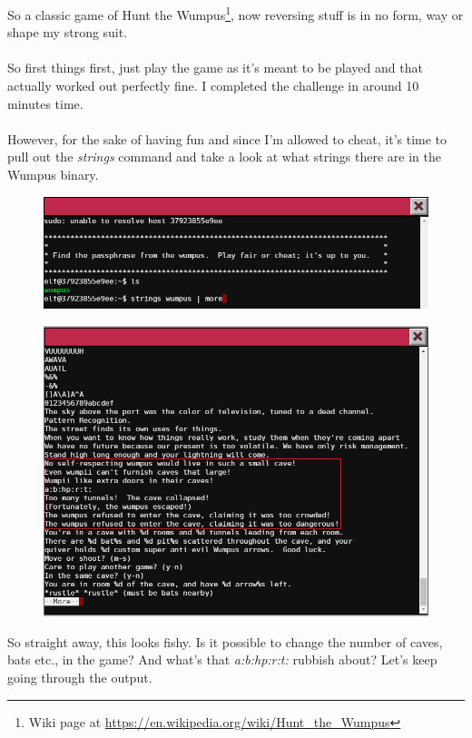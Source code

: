 \documentclass[writeup.tex]{subfiles}
\begin{document}
			So a classic game of Hunt the Wumpus\footnote{Wiki page at \url{https://en.wikipedia.org/wiki/Hunt_the_Wumpus}}, now reversing stuff is in no form, way or shape my strong suit.\\
			\\
			So first things first, just play the game as it's meant to be played and that actually worked out perfectly fine. I completed the challenge in around 10 minutes time.\\
			\\
			However, for the sake of having fun and since I'm allowed to cheat, it's time to pull out the \textit{strings} command and take a look at what strings there are in the Wumpus binary.
			
			\begin{figure}[H]
				\centering
				\includegraphics[width=\linewidth]{"screenshots/terminals/Terminal 4 - ls"}
			\end{figure}
			\begin{figure}[H]
				\centering
				\includegraphics[width=\linewidth]{"screenshots/terminals/Terminal 4 - strings"}
			\end{figure}

			So straight away, this looks fishy. Is it possible to change the number of caves, bats etc., in the game? And what's that \textit{a:b:hp:r:t:} rubbish about? Let's keep going through the output.		
			
\end{document}
